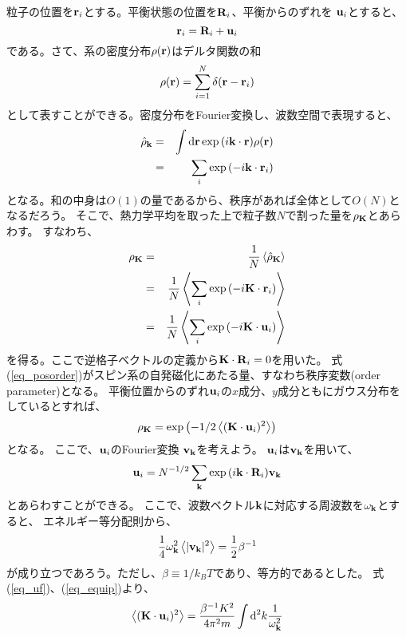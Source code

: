 \documentclass{jarticle}
\renewcommand{\v}[1]{{\bf #1}}
\newcommand{\ave}[1]{\left< #1 \right>}
\begin{document}
粒子の位置を$\v{r}_i$とする。平衡状態の位置を$\v{R}_i$、平衡からのずれを
$\v{u}_i$とすると、
$$
  \v{r}_i = \v{R}_i + \v{u}_i
$$
である。さて、系の密度分布$\rho(\v{r})$はデルタ関数の和
$$
  \rho(\v{r}) = \sum_{i=1}^{N} \delta(\v{r} - \v{r}_i)
$$
として表すことができる。密度分布をFourier変換し、波数空間で表現すると、
\begin{eqnarray}
  \hat{\rho}_{\v{k}} &=& \int \mbox{d} \v{r} \exp{(i \v{k} \cdot \v{r})} \rho(\v{r})\\
  &=& \sum_i \exp{(-i \v{k} \cdot \v{r}_i)}
\end{eqnarray}
となる。和の中身は$O(1)$の量であるから、秩序があれば全体として$O(N)$となるだろう。
そこで、熱力学平均を取った上で粒子数$N$で割った量を$\rho_{\v{K}}$とあらわす。
すなわち、
\begin{eqnarray}
  \rho_{\v{K}} &=& \frac{1}{N} \ave{\hat{\rho}_{\v{K}}} \nonumber \\
  &=& \frac{1}{N} \ave{\sum_i \exp{(-i \v{K} \cdot \v{r}_i)}} \nonumber \\
  &=& \frac{1}{N} \ave{\sum_i \exp{(-i \v{K} \cdot \v{u}_i)}} \label{eq_posorder}
\end{eqnarray}
を得る。ここで逆格子ベクトルの定義から$\v{K}\cdot \v{R}_i = 0 $を用いた。
式(\ref{eq_posorder})がスピン系の自発磁化にあたる量、すなわち秩序変数(order parameter)となる。
平衡位置からのずれ$\v{u}_i$の$x$成分、$y$成分ともにガウス分布をしているとすれば、
\begin{equation}
  \rho_{\v{K}} =  \exp{\left( -1/2 \ave{(\v{K} \cdot \v{u}_i )^2} \right)} \label{eq_exprho}
\end{equation}
となる。
ここで、$\v{u}_i$のFourier変換 $\v{v}_{\v{k}}$を考えよう。
$\v{u}_i$は$\v{v}_{\v{k}}$を用いて、
\begin{equation}
  \v{u}_i = N^{-1/2} \sum_{\v{k}} \exp{(i \v{k} \cdot \v{R}_i)} \v{v}_{\v{k}} \label{eq_uf}
\end{equation}
とあらわすことができる。
ここで、波数ベクトル$\v{k}$に対応する周波数を$\omega_{\v{k}}$とすると、
エネルギー等分配則から、
\begin{equation}
  \frac{1}{4} \omega_{\v{k}}^2 \ave{|\v{v}_{\v{k}}|^2} = \frac{1}{2} \beta^{-1} \label{eq_equip}
\end{equation}
が成り立つであろう。ただし、$\beta \equiv 1/k_B T$であり、等方的であるとした。
式(\ref{eq_uf})、(\ref{eq_equip})より、
\begin{equation}
  \ave{(\v{K} \cdot \v{u}_i)^2 } = \frac{\beta^{-1} K^2}{4 \pi^2 m} \int \mbox{d}^2 k \frac{1}{\omega_{\v{k}}^2}
  \label{eq_ave}
\end{equation}
\end{document}
